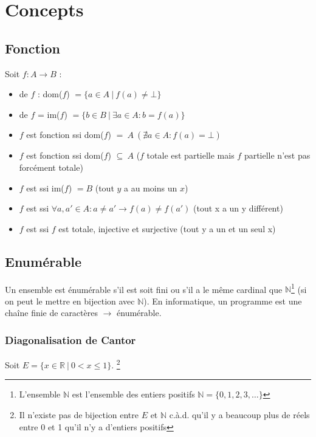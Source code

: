 \chapter{Concepts}

\section{Fonction}

Soit $f : A \rightarrow B$ :
\begin{itemize}
\item {} de $f$ : dom($f$) $= \{a \in A \ | \ f(a) \neq \bot\}$
\item {} de $f$ = im($f$) $= \{b \in B \ | \ \exists a \in A : b = f(a)\}$
\item $f$ est fonction  ssi dom($f$) $= \ A \ (\nexists a \in A : f(a) = \bot)$ 
\item $f$ est fonction  ssi dom($f$) $\subseteq \ A$ ($f$ totale est partielle mais $f$ partielle n'est pas forcément totale)
\item $f$ est  ssi im($f$) $= B$ (tout $y$ a au moins un $x$)
\item $f$ est  ssi $\forall a, a' \in A : a \neq a' \rightarrow f(a) \neq f(a')$ (tout x a un y différent)
\item $f$ est  ssi $f$ est totale, injective et surjective (tout y a un et un seul x)
\end{itemize}

\section{Enumérable}

Un ensemble est énumérable s'il est soit fini ou s'il a le même cardinal que $\mathbb{N}$\footnote{L'ensemble $\mathbb{N}$ est l'ensemble des entiers positifs $\mathbb{N} = \{0, 1, 2, 3, \ldots\}$} (si on peut le mettre en bijection avec $\mathbb{N}$). En informatique, un programme est une chaîne finie de caractères $\rightarrow$ énumérable.

\subsection{Diagonalisation de Cantor}

Soit $E = \{x \in \mathbb{R} \ | \ 0 < x \leq 1\}$. \footnote{Il n'existe pas de bijection entre $E$ et $\mathbb{N}$ c.à.d. qu'il y a beaucoup plus de réels entre 0 et 1 qu'il n'y a d'entiers positifs}

